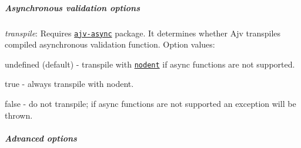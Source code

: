 \subparagraph*{Asynchronous validation options}


\begin{DoxyItemize}
\item {\itshape transpile}\+: Requires \href{https://github.com/epoberezkin/ajv-async}{\tt ajv-\/async} package. It determines whether Ajv transpiles compiled asynchronous validation function. Option values\+:
\begin{DoxyItemize}
\item {\ttfamily undefined} (default) -\/ transpile with \href{https://github.com/MatAtBread/nodent}{\tt nodent} if async functions are not supported.
\item {\ttfamily true} -\/ always transpile with nodent.
\item {\ttfamily false} -\/ do not transpile; if async functions are not supported an exception will be thrown.
\end{DoxyItemize}
\end{DoxyItemize}

\subparagraph*{Advanced options}


